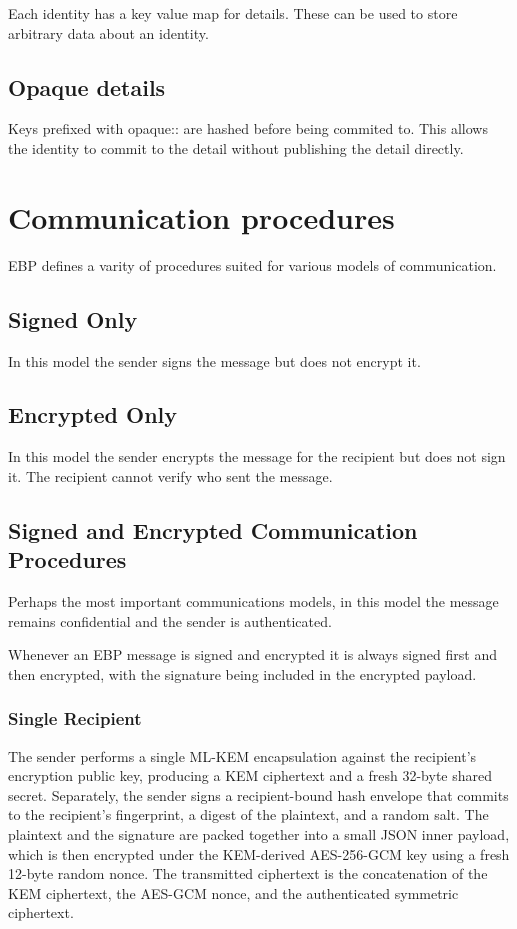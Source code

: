 \documentclass[11pt,a4paper]{article}
\begin{document}
Each identity has a key value map for details. These can be used to store arbitrary data about an identity.

\subsection{Opaque details}

Keys prefixed with opaque:: are hashed before being commited to. This allows the identity to commit to the detail without publishing the detail directly.

\section{Communication procedures}

EBP defines a varity of procedures suited for various models of communication. 

\subsection{Signed Only}

In this model the sender signs the message but does not encrypt it. 

\subsection{Encrypted Only}

In this model the sender encrypts the message for the recipient but does not sign it. The recipient cannot verify who sent the message. 

\subsection{Signed and Encrypted Communication Procedures}

Perhaps the most important communications models, in this model the message remains confidential and the sender is authenticated. 

Whenever an EBP message is signed and encrypted it is always signed first and then encrypted, with the signature being included in the encrypted payload. 

\subsubsection{Single Recipient}

The sender performs a single ML-KEM encapsulation against the recipient's encryption public key, 
producing a KEM ciphertext and a fresh 32-byte shared secret.  Separately, 
the sender signs a recipient-bound hash envelope that commits to the recipient's fingerprint, a digest of
 the plaintext, and a random salt. The plaintext and the signature are packed together into a small JSON inner payload, which is then encrypted under the KEM-derived AES-256-GCM key using a fresh 12-byte random nonce. 
 The transmitted ciphertext is the concatenation of the KEM ciphertext, the AES-GCM nonce, and the authenticated symmetric ciphertext.
\end{document}
